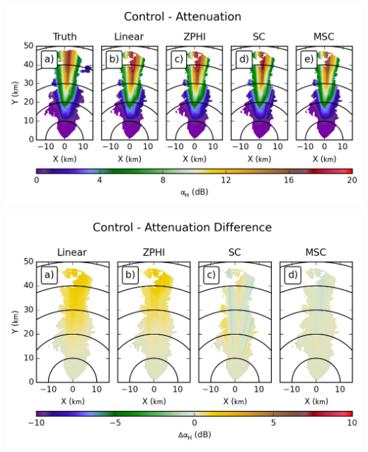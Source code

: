 \documentclass[red]{beamer}
\begin{document}
\begin{frame}
    \begin{center}
        \includegraphics[scale=0.7]{figures/C_Control_Attenuation_H}
    \end{center}
\end{frame}

\begin{frame}
    \begin{center}
        \includegraphics[scale=0.7]{figures/C_Control_Attenuation_Difference_H}
    \end{center}
\end{frame}
\end{document}
